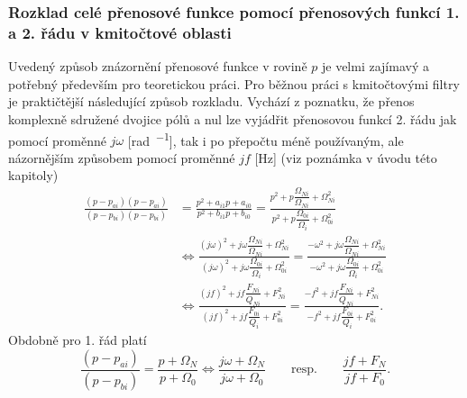         \subsubsection{Rozklad celé přenosové funkce pomocí přenosových funkcí 1. a 2. řádu v
                       kmitočtové oblasti}
          
          Uvedený způsob znázornění přenosové funkce v rovině \(p\) je velmi zajímavý a potřebný
          především pro teoretickou práci. Pro běžnou práci s kmitočtovými filtry je praktičtější
          následující způsob rozkladu. Vychází z poznatku, že přenos komplexně sdružené dvojice pólů
          a nul lze vyjádřit přenosovou funkcí 2. řádu jak pomocí proměnné \(j\omega\)
          [\si{\radian\per\sec}], tak i po přepočtu méně používaným, ale názornějším způsobem pomocí
          proměnné \(jf\) [\si{\Hz}] (viz poznámka v úvodu této kapitoly) 
          \begin{align}\label{aes:eq033}
            \frac{(p-p_{ai})(p-p_{ai})}{(p-p_{bi})(p-p_{bi})}
              &= \frac{p^2 + a_{i1}p + a_{i0}}{p^2 + b_{i1}p + b_{i0}}        
               = \frac{p^2 + p\dfrac{\Omega_{Ni}}{\Omega_{Ni}} +\Omega^2_{Ni}}
                      {p^2 + p\dfrac{\Omega_{0i}}{\Omega_{i}} +\Omega^2_{0i}}        \nonumber  \\   
              &\Leftrightarrow
                 \frac{(j\omega)^2 + j\omega\dfrac{\Omega_{Ni}}{\Omega_{Ni}} +\Omega^2_{Ni}}
                      {(j\omega)^2 + j\omega\dfrac{\Omega_{0i}}{\Omega_{i}} +\Omega^2_{0i}}
               = \frac{-\omega^2   + j\omega\dfrac{\Omega_{Ni}}{\Omega_{Ni}} +\Omega^2_{Ni}}
                      {-\omega^2   + j\omega\dfrac{\Omega_{0i}}{\Omega_{i}} +\Omega^2_{0i}} 
                                                                                      \nonumber  \\   
              &\Leftrightarrow
                 \frac{(jf)^2 + jf\dfrac{F_{Ni}}{Q_{Ni}} + F^2_{Ni}}
                      {(jf)^2 + jf\dfrac{F_{0i}}{Q_{i}}  + F^2_{0i}}
               = \frac{-f^2   + jf\dfrac{F_{Ni}}{Q_{Ni}} + F^2_{Ni}}
                      {-f^2   + jf\dfrac{F_{0i}}{Q_{i}}  + F^2_{0i}}. 
          \end{align}
          Obdobně pro 1. řád platí
          \begin{equation}\label{aes:eq034}
            \frac{(p-p_{ai})}{(p-p_{bi})} = \frac{p + \Omega_N}{p + \Omega_0} \Leftrightarrow
            \frac{j\omega + \Omega_N}{j\omega + \Omega_0}\qquad\text{resp.}\qquad
            \frac{jf + F_N}{jf + F_0}.
          \end{equation}
                    
